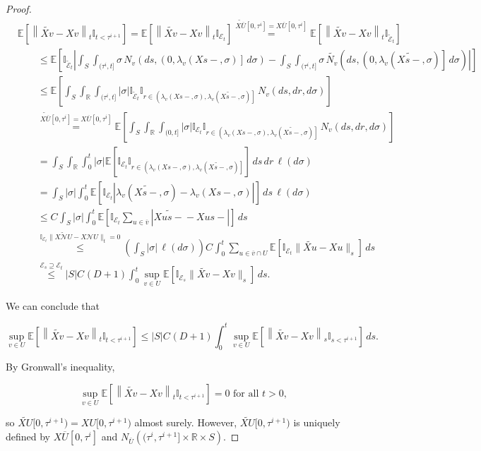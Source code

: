 \documentclass[12pt]{article}
\newcommand{\mb}{\mathbb}
\newcommand{\mc}{\mathcal}
\newcommand{\ov}{\overline}
\newcommand{\os}{\overset}
\newcommand{\te}{\text}
\newcommand{\ind}{\hspace{24pt}}
\newcommand{\ex}[1]{\mb{E}\left[#1\right]}			%
\renewcommand{\v}{v}							%
\newcommand{\vv}{u}								%
\renewcommand{\U}{U}							%
\renewcommand{\S}{S}							%
\newcommand{\s}{\sigma}							%
\renewcommand{\t}{t}							%
\renewcommand{\tt}{s}							%
\newcommand{\X}{X}								%
\newcommand{\neigh}{\mc{N}}						%
\newcommand{\cl}{\ov}							%
\newcommand{\degr}{D}								%
\newcommand{\poiss}[1]{N_{#1}}						%
\renewcommand{\r}{r}								%
\newcommand{\rt}[1]{\tau^{#1}}						%
\newcommand{\itt}{i}								%
\newcommand{\rate}[1]{\lambda_{#1}}					%
\newcommand{\const}[1]{C_{#1}}						%
\newcommand{\Sm}{\ell}								%
\newcommand{\alt}{\widetilde}						%
\newcommand{\evnt}{\mc{E}}						%
\begin{document}
\begin{proof}
\begin{align*}
&\ex{\left\|\alt{\X{\v}{}} - \X{\v}{}\right\|_{\t}\mb{I}_{\t < \rt{\itt+1}}} = \ex{\left\|\alt{\X{\v}{}} - \X{\v}{}\right\|_{\t}\mb{I}_{\evnt_\t}}\os{\alt{\X{\cl{\U}}{}}[0,\rt{\itt}] = \X{\cl{\U}}{[0,\rt{\itt}]}}{=} \ex{\left\|\alt{\X{\v}{}} - \X{\v}{}\right\|_{\t}\mb{I}_{\alt{\evnt}_\t}}\\
&\ind\leq \ex{\mb{I}_{\alt{\evnt}_\t}\left|\int_\S\int_{(\rt{\itt},t]} \s\,\poiss{\v}\left(d\tt,\left(0,\rate{\v}(\X{}{\tt-},\s)\right]\,d\s\right) - \int_\S\int_{(\rt{\itt},\t]} \s\,\alt{\poiss{\v}}\left(d\tt,\left(0,\rate{\v}(\alt{\X{}{\tt-}},\s)\right]\,d\s\right)\right|}\\
&\ind \leq \ex{\int_\S\int_{\mb{R}}\int_{(\rt{\itt},\t]}|\s|\mb{I}_{\alt{\evnt}_\t}\mb{I}_{\r\in \left(\rate{\v}(\X{}{\tt-},\s), \rate{\v}(\alt{\X{}{\tt-}},\s)\right]}\,\poiss{\v}\left(d\tt,d\r,d\s\right)}\\
&\ind \os{\alt{\X{\cl{\U}}{}}[0,\rt{\itt}] = \X{\cl{\U}}{[0,\rt{\itt}]}}{=} \ex{\int_\S\int_{\mb{R}}\int_{(0,\t]}|\s|\mb{I}_{\evnt_\t}\mb{I}_{\r\in \left(\rate{\v}(\X{}{\tt-},\s), \rate{\v}(\alt{\X{}{\tt-}},\s)\right]}\,\poiss{\v}\left(d\tt,d\r,d\s\right)}\\
&\ind = \int_\S\int_\mb{R}\int_0^\t |\s|\ex{\mb{I}_{\evnt_\t}\mb{I}_{\r\in\left(\rate{\v}(\X{}{\tt-},\s),\rate{\v}(\alt{\X{}{\tt-}},\s)\right]}}\,d\tt\,d\r\,\Sm(d\s)\\
&\ind = \int_\S |\s|\int_0^\t \ex{\mb{I}_{\evnt_t}\left|\rate{\v}(\alt{\X{}{\tt-}},\s) - \rate{\v}(\X{}{\tt-},\s)\right|}\,d\tt\,\Sm(d\s)\\
&\ind \leq \const{}\int_\S|\s|\int_0^\t\ex{\mb{I}_{\evnt_t}\sum_{\vv\in \cl{\v}}\left|\alt{\X{\vv}{\tt-}} - \X{\vv}{\tt-}\right|}\,d\tt\\
&\ind \os{\mb{I}_{\evnt_\t}\|\alt{\X{\neigh{\U}}{}} - \X{\neigh{\U}}{}\|_t = 0}{\leq} \left(\int_\S|\s|\,\Sm(d\s)\right)\const{} \int_0^\t \sum_{\vv\in \cl{\v}\cap\U}\ex{\mb{I}_{\evnt_t}\|\alt{\X{\vv}{}} - \X{\vv}{}\|_\tt}\,d\tt\\
&\ind \os{\evnt_\tt \supseteq \evnt_\t}{\leq} |S|\const{}(\degr+1) \int_0^\t \sup_{\v\in \U}\ex{\mb{I}_{\evnt_\tt}\|\alt{\X{\v}{}} - \X{\v}{}\|_\tt}\,d\tt.
\end{align*}

We can conclude that

\[\sup_{\v\in \U}\ex{\left\|\alt{\X{\v}{}} - \X{\v}{}\right\|_{\t}\mb{I}_{t <\rt{\itt+1}}} \leq |\S|\const{}(\degr+1)\int_0^\t\sup_{v\in\U}\ex{\left\|\alt{\X{\v}{}} - \X{\v}{}\right\|_\tt\mb{I}_{\tt < \rt{\itt+1}}}\,d\tt.\]

By Gronwall's inequality,

\[\sup_{v\in \U}\ex{\left\|\alt{\X{\v}{}} - \X{\v}{}\right\|_\t\mb{I}_{\t < \rt{\itt+1}}} = 0 \te{ for all } \t > 0,\]

so \(\alt{\X{\U}{}}[0,\rt{\itt+1}) = \X{\U}{[0,\rt{\itt+1})}\) almost surely. However, \(\alt{\X{\U}{}}[0,\rt{\itt+1})\) is uniquely defined by \(\X{\cl{\U}}{[0,\rt{\itt}]}\) and \(\poiss{\cl{\U}}\left((\rt{\itt},\rt{\itt+1}]\times \mb{R}\times \S\right)\).
\end{proof}
\end{document}
